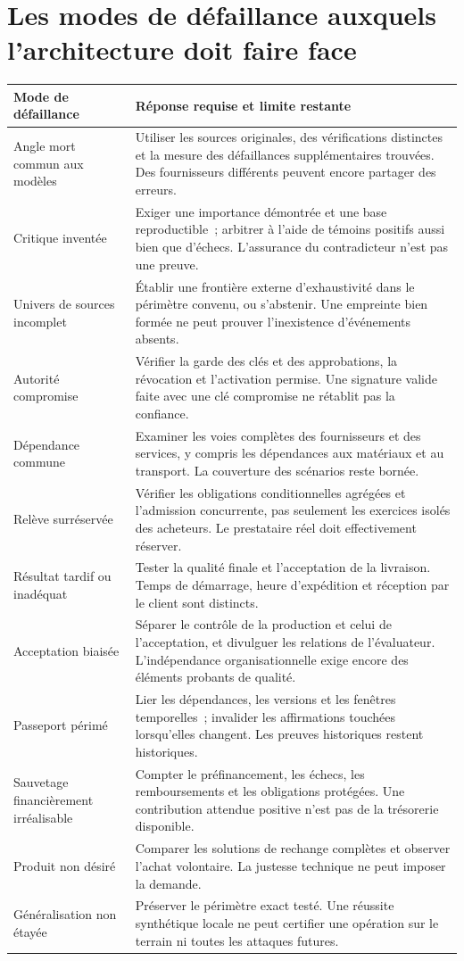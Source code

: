 \documentclass[11pt,a4paper]{article}
\begin{document}
\section{Les modes de défaillance auxquels l’architecture doit faire face}\label{sec:failures}
\begingroup
\small
\begin{longtable}{P{.25\textwidth}P{.68\textwidth}}
\toprule
\textbf{Mode de défaillance} & \textbf{Réponse requise et limite restante}\\
\midrule
\endhead
Angle mort commun aux modèles & Utiliser les sources originales, des vérifications distinctes et la mesure des défaillances supplémentaires trouvées. Des fournisseurs différents peuvent encore partager des erreurs.\\
Critique inventée & Exiger une importance démontrée et une base reproductible~; arbitrer à l’aide de témoins positifs aussi bien que d’échecs. L’assurance du contradicteur n’est pas une preuve.\\
Univers de sources incomplet & Établir une frontière externe d’exhaustivité dans le périmètre convenu, ou s’abstenir. Une empreinte bien formée ne peut prouver l’inexistence d’événements absents.\\
Autorité compromise & Vérifier la garde des clés et des approbations, la révocation et l’activation permise. Une signature valide faite avec une clé compromise ne rétablit pas la confiance.\\
Dépendance commune & Examiner les voies complètes des fournisseurs et des services, y compris les dépendances aux matériaux et au transport. La couverture des scénarios reste bornée.\\
Relève surréservée & Vérifier les obligations conditionnelles agrégées et l’admission concurrente, pas seulement les exercices isolés des acheteurs. Le prestataire réel doit effectivement réserver.\\
Résultat tardif ou inadéquat & Tester la qualité finale et l’acceptation de la livraison. Temps de démarrage, heure d’expédition et réception par le client sont distincts.\\
Acceptation biaisée & Séparer le contrôle de la production et celui de l’acceptation, et divulguer les relations de l’évaluateur. L’indépendance organisationnelle exige encore des éléments probants de qualité.\\
Passeport périmé & Lier les dépendances, les versions et les fenêtres temporelles~; invalider les affirmations touchées lorsqu’elles changent. Les preuves historiques restent historiques.\\
Sauvetage financièrement irréalisable & Compter le préfinancement, les échecs, les remboursements et les obligations protégées. Une contribution attendue positive n’est pas de la trésorerie disponible.\\
Produit non désiré & Comparer les solutions de rechange complètes et observer l’achat volontaire. La justesse technique ne peut imposer la demande.\\
Généralisation non étayée & Préserver le périmètre exact testé. Une réussite synthétique locale ne peut certifier une opération sur le terrain ni toutes les attaques futures.\\
\bottomrule
\end{longtable}
\end{document}
